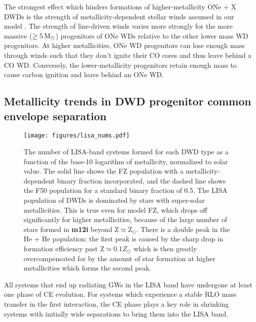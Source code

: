 \documentclass[twocolumn]{aastex631}
\begin{document}
The strongest effect which hinders formations of higher-metallicity ONe + X DWDs is the strength of metallicity-dependent stellar winds assumed in our model \citep{Vink2001}. The strength of line-driven winds varies more strongly for the more massive ($\geq5\,\rm{M}_\odot$) progenitors of ONe WDs relative to the other lower mass WD progenitors. At higher metallicities, ONe WD progenitors can lose enough mass through winds such that they don't ignite their CO cores and thus leave behind a CO WD. Conversely, the lower-metallicity progenitors retain enough mass to cause carbon ignition and leave behind an ONe WD.

\subsection{Metallicity trends in DWD progenitor common envelope separation}\label{sec:CEsep}

\begin{figure*}
	\texttt{[image: figures/lisa\_nums.pdf]}
    \caption{The number of LISA-band systems formed for each DWD type as a function of the base-10 logarithm of metallicity, normalized to solar value. The solid line shows the FZ population with a metallicity-dependent binary fraction incorporated, and the dashed line shows the F50 population for a standard binary fraction of 0.5. The LISA population of DWDs is dominated by stars with super-solar metallicities. This is true even for model FZ, which drops off significantly for higher metallicities, because of the large number of stars formed in \textbf{m12i} beyond Z$\simeq$Z$_\odot$. There is a double peak in the He + He population; the first peak is caused by the sharp drop in formation efficiency past Z$\simeq$0.1$Z_\odot$ which is then greatly overcompensated for by the amount of star formation at higher metallicities which forms the second peak.}
    \label{fig:lisa_nums}
\end{figure*}

All systems that end up radiating GWs in the LISA band have undergone at least one phase of CE evolution. For systems which experience a stable RLO mass transfer in the first interaction, the CE phase plays a key role in shrinking systems with initially wide separations to bring them into the LISA band. 
\end{document}
